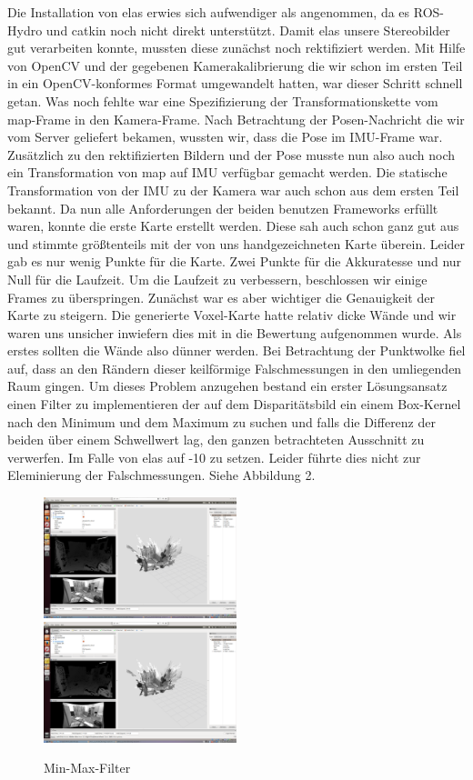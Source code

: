 \documentclass[12pt,titlepage, a4paper]{article}
\begin{document}
Die Installation von elas erwies sich aufwendiger als angenommen, da es ROS-Hydro und catkin noch nicht direkt unterstützt. Damit elas unsere Stereobilder gut verarbeiten konnte, mussten diese zunächst noch rektifiziert werden. Mit Hilfe von OpenCV und der gegebenen Kamerakalibrierung die wir schon im ersten Teil in ein OpenCV-konformes Format umgewandelt hatten, war dieser Schritt schnell getan. Was noch fehlte war eine Spezifizierung der Transformationskette vom map-Frame in den Kamera-Frame. Nach Betrachtung der Posen-Nachricht die wir vom Server geliefert bekamen, wussten wir, dass die Pose im IMU-Frame war. Zusätzlich zu den rektifizierten Bildern und der Pose musste nun also auch noch ein Transformation von map auf IMU verfügbar gemacht werden. Die statische Transformation von der IMU zu der Kamera war auch schon aus dem ersten Teil bekannt. Da nun alle Anforderungen der beiden benutzen Frameworks erfüllt waren, konnte die erste Karte erstellt werden. Diese sah auch schon ganz gut aus und stimmte 
größtenteils mit der von uns handgezeichneten Karte überein. Leider gab es nur wenig Punkte für die Karte. Zwei Punkte für die Akkuratesse und nur Null für die Laufzeit. Um die Laufzeit zu verbessern, beschlossen wir einige Frames zu überspringen. Zunächst war es aber wichtiger die Genauigkeit der Karte zu steigern. Die generierte Voxel-Karte hatte relativ dicke Wände und wir waren uns unsicher inwiefern dies mit in die Bewertung aufgenommen wurde. Als erstes sollten die Wände also dünner werden. Bei Betrachtung der Punktwolke fiel auf, dass an den Rändern dieser keilförmige Falschmessungen in den umliegenden Raum gingen. Um dieses Problem anzugehen bestand ein erster Lösungsansatz einen Filter zu implementieren der auf dem Disparitätsbild ein einem Box-Kernel nach den Minimum und dem Maximum zu suchen und falls die Differenz der beiden über einem Schwellwert lag, den ganzen betrachteten Ausschnitt zu verwerfen. Im Falle von elas auf -10 zu setzen. Leider führte dies nicht zur Eleminierung der 
Falschmessungen. Siehe Abbildung 2.
\begin{figure}[ht]
 \includegraphics[width=0.5\textwidth]{./jumpEdge/lab_report_je_off.png}
 \includegraphics[width=0.5\textwidth]{./jumpEdge/lab_report_je_on_17.png}
 \caption{Min-Max-Filter}
 \label{Figure 2}
\end{figure}
\end{document}
